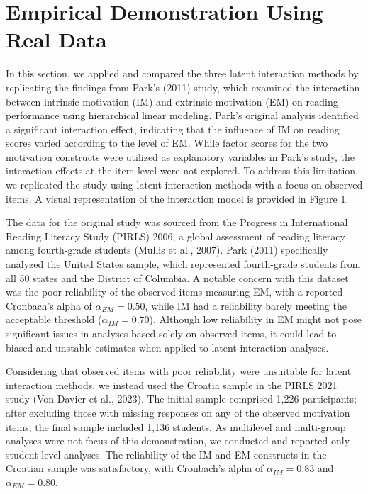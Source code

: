 \documentclass[
  man]{apa6}
\begin{document}
\section{Empirical Demonstration Using Real Data}\label{empirical-demonstration-using-real-data}

In this section, we applied and compared the three latent interaction methods by replicating the findings from Park's (2011) study, which examined the interaction between intrinsic motivation (IM) and extrinsic motivation (EM) on reading performance using hierarchical linear modeling. Park's original analysis identified a significant interaction effect, indicating that the influence of IM on reading scores varied according to the level of EM. While factor scores for the two motivation constructs were utilized as explanatory variables in Park's study, the interaction effects at the item level were not explored. To address this limitation, we replicated the study using latent interaction methods with a focus on observed items. A visual representation of the interaction model is provided in Figure 1.

The data for the original study was sourced from the Progress in International Reading Literacy Study (PIRLS) 2006, a global assessment of reading literacy among fourth-grade students (Mullis et al., 2007). Park (2011) specifically analyzed the United States sample, which represented fourth-grade students from all 50 states and the District of Columbia. A notable concern with this dataset was the poor reliability of the observed items measuring EM, with a reported Cronbach's alpha of \(\alpha_{EM} = 0.50\), while IM had a reliability barely meeting the acceptable threshold (\(\alpha_{IM} = 0.70\)). Although low reliability in EM might not pose significant issues in analyses based solely on observed items, it could lead to biased and unstable estimates when applied to latent interaction analyses.

Considering that observed items with poor reliability were unsuitable for latent interaction methods, we instead used the Croatia sample in the PIRLS 2021 study (Von Davier et al., 2023). The initial sample comprised 1,226 participants; after excluding those with missing responses on any of the observed motivation items, the final sample included 1,136 students. As multilevel and multi-group analyses were not focus of this demonstration, we conducted and reported only student-level analyses. The reliability of the IM and EM constructs in the Croatian sample was satisfactory, with Cronbach's alpha of \(\alpha_{IM} = 0.83\) and \(\alpha_{EM} = 0.80\).
\end{document}
